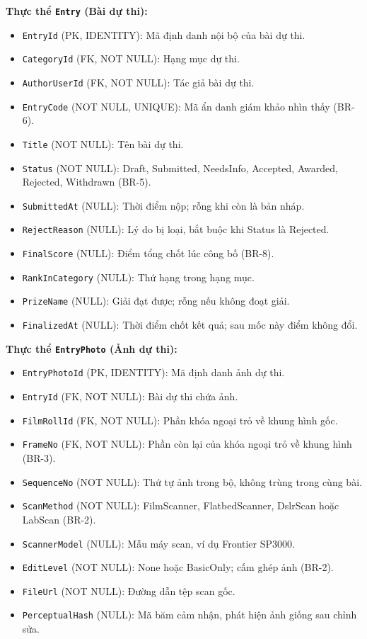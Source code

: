 \noindent\textbf{Thực thể \texttt{Entry} (Bài dự thi):}

\begin{itemize}
    \item \texttt{EntryId} (PK, IDENTITY): Mã định danh nội bộ của bài dự thi.
    \item \texttt{CategoryId} (FK, NOT NULL): Hạng mục dự thi.
    \item \texttt{AuthorUserId} (FK, NOT NULL): Tác giả bài dự thi.
    \item \texttt{EntryCode} (NOT NULL, UNIQUE): Mã ẩn danh giám khảo nhìn thấy (BR-6).
    \item \texttt{Title} (NOT NULL): Tên bài dự thi.
    \item \texttt{Status} (NOT NULL): Draft, Submitted, NeedsInfo, Accepted, Awarded, Rejected, Withdrawn (BR-5).
    \item \texttt{SubmittedAt} (NULL): Thời điểm nộp; rỗng khi còn là bản nháp.
    \item \texttt{RejectReason} (NULL): Lý do bị loại, bắt buộc khi Status là Rejected.
    \item \texttt{FinalScore} (NULL): Điểm tổng chốt lúc công bố (BR-8).
    \item \texttt{RankInCategory} (NULL): Thứ hạng trong hạng mục.
    \item \texttt{PrizeName} (NULL): Giải đạt được; rỗng nếu không đoạt giải.
    \item \texttt{FinalizedAt} (NULL): Thời điểm chốt kết quả; sau mốc này điểm không đổi.
\end{itemize}

\noindent\textbf{Thực thể \texttt{EntryPhoto} (Ảnh dự thi):}

\begin{itemize}
    \item \texttt{EntryPhotoId} (PK, IDENTITY): Mã định danh ảnh dự thi.
    \item \texttt{EntryId} (FK, NOT NULL): Bài dự thi chứa ảnh.
    \item \texttt{FilmRollId} (FK, NOT NULL): Phần khóa ngoại trỏ về khung hình gốc.
    \item \texttt{FrameNo} (FK, NOT NULL): Phần còn lại của khóa ngoại trỏ về khung hình (BR-3).
    \item \texttt{SequenceNo} (NOT NULL): Thứ tự ảnh trong bộ, không trùng trong cùng bài.
    \item \texttt{ScanMethod} (NOT NULL): FilmScanner, FlatbedScanner, DslrScan hoặc LabScan (BR-2).
    \item \texttt{ScannerModel} (NULL): Mẫu máy scan, ví dụ Frontier SP3000.
    \item \texttt{EditLevel} (NOT NULL): None hoặc BasicOnly; cấm ghép ảnh (BR-2).
    \item \texttt{FileUrl} (NOT NULL): Đường dẫn tệp scan gốc.
    \item \texttt{PerceptualHash} (NULL): Mã băm cảm nhận, phát hiện ảnh giống sau chỉnh sửa.
\end{itemize}


